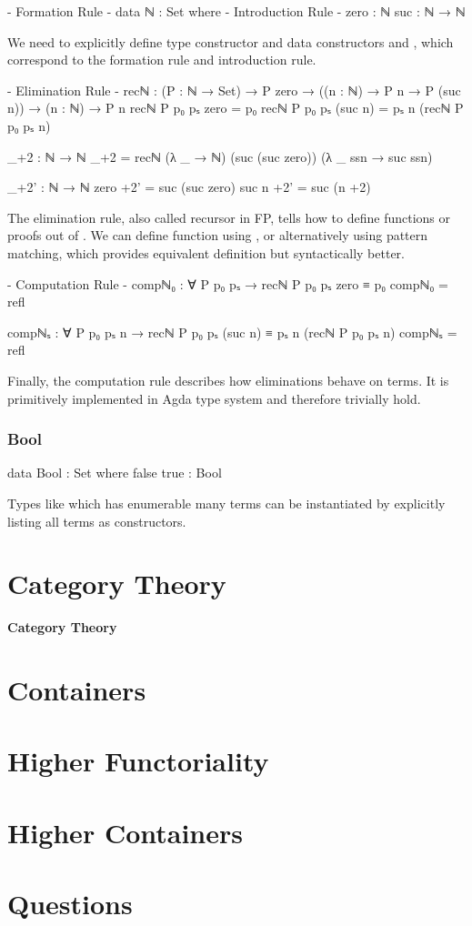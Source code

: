 \begin{code}
{- Formation Rule -}
data ℕ : Set where
  {- Introduction Rule -}
  zero : ℕ
  suc  : ℕ → ℕ
\end{code}

We need to explicitly define type constructor  and data constructors  and , which correspond to the formation rule and introduction rule.

\begin{code}
{- Elimination Rule -}
recℕ : (P : ℕ → Set)
  → P zero
  → ((n : ℕ) → P n → P (suc n))
  → (n : ℕ) → P n
recℕ P p₀ pₛ zero = p₀
recℕ P p₀ pₛ (suc n) = pₛ n (recℕ P p₀ pₛ n)

_+2 : ℕ → ℕ
_+2 = recℕ (λ _ → ℕ) (suc (suc zero)) (λ _ ssn → suc ssn)

_+2' : ℕ → ℕ
zero +2' = suc (suc zero)
suc n +2' = suc (n +2)
\end{code}

The elimination rule, also called recursor in FP, tells how to define functions or proofs out of . We can define function  using , or alternatively using pattern matching, which provides equivalent definition but syntactically better.

\begin{code}
{- Computation Rule -}
compℕ₀ : ∀ {P p₀ pₛ}
  → recℕ P p₀ pₛ zero ≡ p₀
compℕ₀ = refl

compℕₛ : ∀ {P p₀ pₛ n} 
  → recℕ P p₀ pₛ (suc n) ≡ pₛ n (recℕ P p₀ pₛ n)
compℕₛ = refl
\end{code}

Finally, the computation rule describes how eliminations behave on terms. It is primitively implemented in Agda type system and therefore trivially hold.

\subsubsection*{Bool}

\begin{code}
data Bool : Set where
  false true : Bool
\end{code}

Types like  which has enumerable many terms can be instantiated by explicitly listing all terms as constructors.

\section{Category Theory}

\textbf{Category Theory}

\section{Containers}

\section{Higher Functoriality}

\section{Higher Containers}

\section{Questions}
